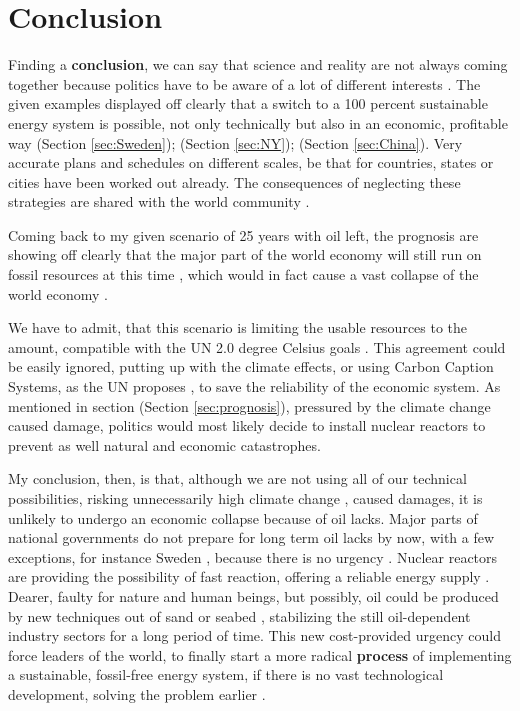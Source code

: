\section{Conclusion}
Finding a \textbf{conclusion}, we can say that science and reality are not always coming together
because politics have to be aware of a lot of different interests \cite{NYT1} \cite[1]{ChinaEvol}. 
The given examples displayed off clearly that a switch to a 100 percent sustainable energy system is
possible, not only technically but also in an economic, profitable way (Section \ref{sec:Sweden}); (Section \ref{sec:NY}); (Section \ref{sec:China}).
Very accurate plans and schedules on different scales, be that for countries, states or cities have been worked out already.
The consequences of neglecting these strategies are shared with the world community \cite{Bible}.
\par
Coming back to my given scenario of 25 years with oil left, the prognosis are showing off clearly that the major part of the world economy
will still run on fossil resources at this time \cite[633]{UN_Climate_Goals} , which would in fact cause a vast collapse of the world economy \cite{Bible} \cite[633]{UN_Climate_Goals}.
\par
We have to admit, that this scenario is limiting the usable resources to the amount, compatible with the UN 2.0 degree Celsius goals \cite[14]{BP} \cite{Industries}.
This agreement could be easily ignored, putting up with the climate effects, or using Carbon Caption Systems, as the UN proposes \cite{UN_Plan}, to save the reliability of the economic system.
As mentioned in section (Section \ref{sec:prognosis}), pressured by the climate change caused damage, politics would most likely decide to install nuclear reactors
to prevent as well natural and economic catastrophes.
\par
{\Large My conclusion, then, is that}, although we are not using all of our technical possibilities, risking unnecessarily high climate change \cite{Sweden}, caused damages,
it is unlikely to undergo an economic collapse because of oil lacks.
Major parts of national governments do not prepare for long term oil lacks by now, with a few exceptions, for instance Sweden \cite{Sweden}, because there is no urgency \cite[4]{BP} \cite{UN_Plan}.
Nuclear reactors are providing the possibility of fast reaction, offering a reliable energy supply \cite{nuclear}.
Dearer, faulty for nature and human beings, but possibly, oil could be produced by new techniques out of sand or seabed \cite{canadianSand}, stabilizing the still oil-dependent industry sectors for a long period of time\cite{IEAApril}.
This new cost-provided urgency could force leaders of the world, to finally start a more radical \textbf{process} of implementing a sustainable, fossil-free energy system, if there is no vast technological development, solving the problem earlier \cite{UN_Plan} \cite{ChinaEvol} \cite{WEO}.
